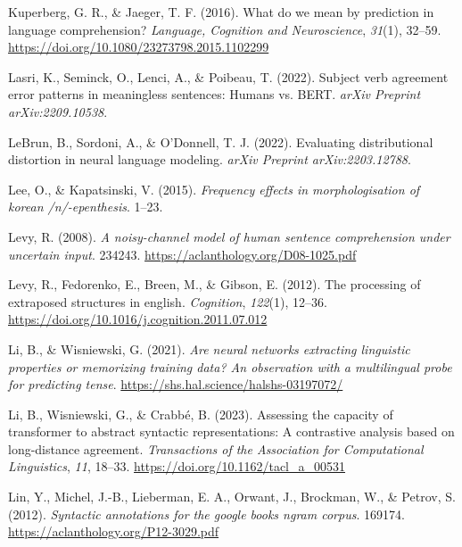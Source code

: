 \documentclass[
  12pt,
  letterpaper,
]{scrreport}
\newlength{\cslhangindent}
\newenvironment{CSLReferences}[2] %
 {\begin{list}{}{%
  \setlength{\itemindent}{0pt}
  \setlength{\leftmargin}{0pt}
  \setlength{\parsep}{0pt}
  \ifodd #1
   \setlength{\leftmargin}{\cslhangindent}
   \setlength{\itemindent}{-1\cslhangindent}
  \fi
  \setlength{\itemsep}{#2\baselineskip}}}
 {\end{list}}
\begin{document}
\begin{CSLReferences}{1}{0}
Kuperberg, G. R., \& Jaeger, T. F. (2016). What do we mean by prediction
in language comprehension? \emph{Language, Cognition and Neuroscience},
\emph{31}(1), 32--59.
\url{https://doi.org/10.1080/23273798.2015.1102299}

Lasri, K., Seminck, O., Lenci, A., \& Poibeau, T. (2022). Subject verb
agreement error patterns in meaningless sentences: Humans vs. BERT.
\emph{arXiv Preprint arXiv:2209.10538}.

LeBrun, B., Sordoni, A., \& O'Donnell, T. J. (2022). Evaluating
distributional distortion in neural language modeling. \emph{arXiv
Preprint arXiv:2203.12788}.

Lee, O., \& Kapatsinski, V. (2015). \emph{Frequency effects in
morphologisation of korean /n/-epenthesis}. 1--23.

Levy, R. (2008). \emph{A noisy-channel model of human sentence
comprehension under uncertain input}. 234243.
\url{https://aclanthology.org/D08-1025.pdf}

Levy, R., Fedorenko, E., Breen, M., \& Gibson, E. (2012). The processing
of extraposed structures in english. \emph{Cognition}, \emph{122}(1),
12--36. \url{https://doi.org/10.1016/j.cognition.2011.07.012}

Li, B., \& Wisniewski, G. (2021). \emph{Are neural networks extracting
linguistic properties or memorizing training data? An observation with a
multilingual probe for predicting tense}.
\url{https://shs.hal.science/halshs-03197072/}

Li, B., Wisniewski, G., \& Crabbé, B. (2023). Assessing the capacity of
transformer to abstract syntactic representations: A contrastive
analysis based on long-distance agreement. \emph{Transactions of the
Association for Computational Linguistics}, \emph{11}, 18--33.
\url{https://doi.org/10.1162/tacl_a_00531}

Lin, Y., Michel, J.-B., Lieberman, E. A., Orwant, J., Brockman, W., \&
Petrov, S. (2012). \emph{Syntactic annotations for the google books
ngram corpus}. 169174. \url{https://aclanthology.org/P12-3029.pdf}


\end{CSLReferences}
\end{document}
